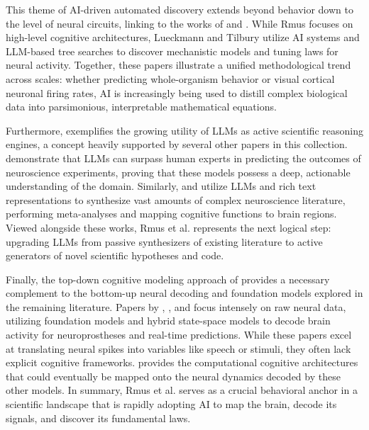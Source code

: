 This theme of AI-driven automated discovery extends beyond behavior down to the level of neural circuits, linking \citet{rmus2025generating} to the works of \citet{lueckmann2026discovering} and \citet{tilbury2025ai}. While Rmus focuses on high-level cognitive architectures, Lueckmann and Tilbury utilize AI systems and LLM-based tree searches to discover mechanistic models and tuning laws for neural activity. Together, these papers illustrate a unified methodological trend across scales: whether predicting whole-organism behavior or visual cortical neuronal firing rates, AI is increasingly being used to distill complex biological data into parsimonious, interpretable mathematical equations.

Furthermore, \citet{rmus2025generating} exemplifies the growing utility of LLMs as active scientific reasoning engines, a concept heavily supported by several other papers in this collection. \citet{luo2025large} demonstrate that LLMs can surpass human experts in predicting the outcomes of neuroscience experiments, proving that these models possess a deep, actionable understanding of the domain. Similarly, \citet{luppi2025cognitive} and \citet{ghayem2026neurocontext} utilize LLMs and rich text representations to synthesize vast amounts of complex neuroscience literature, performing meta-analyses and mapping cognitive functions to brain regions. Viewed alongside these works, Rmus et al. represents the next logical step: upgrading LLMs from passive synthesizers of existing literature to active generators of novel scientific hypotheses and code.

Finally, the top-down cognitive modeling approach of \citet{rmus2025generating} provides a necessary complement to the bottom-up neural decoding and foundation models explored in the remaining literature. Papers by \citet{wang2025foundation}, \citet{ryoo2025generalizable}, and \citet{wairagkar2025instantaneous} focus intensely on raw neural data, utilizing foundation models and hybrid state-space models to decode brain activity for neuroprostheses and real-time predictions. While these papers excel at translating neural spikes into variables like speech or stimuli, they often lack explicit cognitive frameworks. \citet{rmus2025generating} provides the computational cognitive architectures that could eventually be mapped onto the neural dynamics decoded by these other models. In summary, Rmus et al. serves as a crucial behavioral anchor in a scientific landscape that is rapidly adopting AI to map the brain, decode its signals, and discover its fundamental laws.

\newpage



